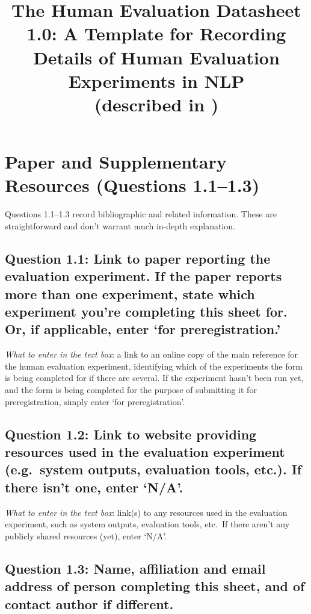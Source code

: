 \documentclass[11pt,a4paper]{article}
\title{The Human Evaluation Datasheet 1.0: A Template for Recording\\Details of Human Evaluation Experiments in NLP\\
\normalsize{(described in \citet{shimorina-belz-2021-heds})}
}
\begin{document}
\maketitle


\section{Paper and Supplementary Resources (Questions 1.1--1.3)}\label{sec:paper-resources}

Questions 1.1--1.3 record bibliographic and related information. These are straightforward and don't warrant much in-depth explanation.

\vspace{-.3cm}
\subsection*{Question 1.1: Link to paper reporting the evaluation experiment. If the paper reports more than one experiment, state which experiment you're completing this sheet for. Or, if applicable, enter `for preregistration.'}

\noindent\textit{What to enter in the text box}: a link to an online copy of the main reference for the human evaluation experiment, identifying which of the experiments the form is being completed for if there are several. If the experiment hasn't been run yet, and the form is being completed for the purpose of submitting it for preregistration, simply enter `for preregistration'.

\vspace{-.3cm}
\subsection*{Question 1.2: Link to website providing resources used in the evaluation experiment (e.g.\ system outputs, evaluation tools, etc.). If there isn't one, enter `N/A'.}

\noindent\textit{What to enter in the text box}: link(s) to any resources used in the evaluation experiment, such as system outputs, evaluation tools, etc.\ If there aren't any publicly shared resources (yet), enter `N/A’.
\
\vspace{-.3cm}
\subsection*{Question 1.3: Name, affiliation and email address of person completing this sheet, and of contact author if different.}
\end{document}
